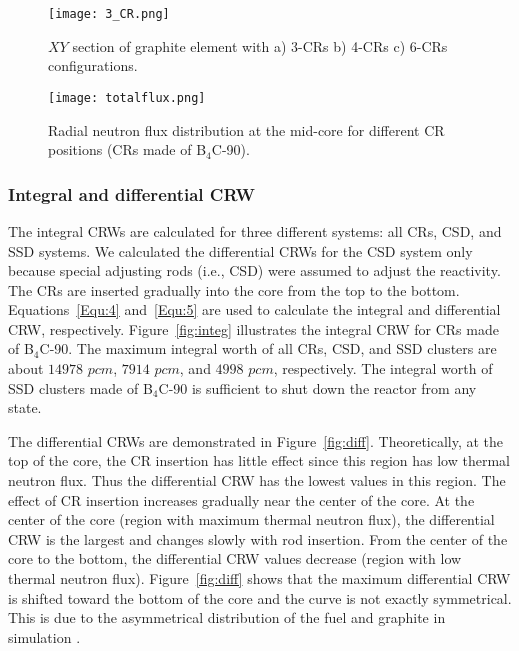 \begin{figure}[!ht]
	\centering
	\texttt{[image: 3\_CR.png]}
	\vspace{-0.5in}
	\caption{$XY$ section of graphite element with a) 3-CRs b) 4-CRs c) 6-CRs configurations.} 
	\label{fig:3_CR}
\end{figure}

\begin{figure}[!ht]
	\centering
	\texttt{[image: totalflux.png]}
	\vspace{-0.5in}
	\caption{Radial neutron flux distribution at the mid-core for different 
	CR positions (CRs made of B$_4$C-90).} 
	\label{fig:totalflux}
\end{figure}
 

\subsubsection{Integral and differential CRW}

The integral CRWs are calculated for three different systems: all CRs, CSD, and SSD systems. We calculated the differential CRWs for the CSD system only because special adjusting rods (i.e., CSD) were assumed to adjust the reactivity.
The CRs are inserted gradually into the core from the top to the bottom. 
Equations~\ref{Equ:4} and~\ref{Equ:5} are used to calculate the integral and 
differential CRW, respectively. Figure~\ref{fig:integ} illustrates the integral CRW for CRs 
made of B$_4$C-90. The maximum integral worth of all CRs, CSD, and SSD 
clusters are about $14978$ $pcm$, $7914$ $pcm$, and $4998$ $pcm$, respectively. The 
integral worth of SSD clusters made of B$_4$C-90 is sufficient to shut down the reactor from any 
state.

The differential CRWs are demonstrated in Figure~\ref{fig:diff}. Theoretically, at the top of the core, the CR insertion has little effect since this region has low thermal neutron flux. Thus the differential CRW has the lowest values in this region. The effect of CR insertion increases gradually near the center of the core. At the center of the core (region with maximum thermal neutron flux), the differential CRW is the largest and changes slowly with rod insertion. From the center of the core to the bottom, the differential CRW values decrease (region with low thermal neutron flux). Figure~\ref{fig:diff} shows that the maximum differential CRW is shifted toward the bottom of the core and the curve is not exactly symmetrical. This is due to the asymmetrical distribution of the fuel and graphite in simulation \cite{xuemei2013study,son2016control}.

